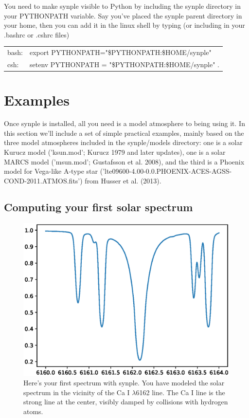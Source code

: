 \documentclass[]{article}
\begin{document}
You need to make synple visible to Python by including the synple directory in your PYTHONPATH variable. Say you've placed the synple parent directory in your home, then you can add it in the linux shell by typing (or including in your .bashrc or .cshrc files)
\begin{table}[h]
\begin{tabular}{ll}
bash: & export PYTHONPATH="\$PYTHONPATH:\$HOME/synple"  \\
csh:  & setenv PYTHONPATH = "\$PYTHONPATH:\$HOME/synple" .
\end{tabular}
\end{table}


\section{Examples}

Once synple is installed, all you need is a model atmosphere to being using it. In this section we'll include a set of simple practical examples, mainly based on the three model atmospheres included in the synple/models directory: one is a solar Kurucz model ('ksun.mod'; Kurucz 1979 and later updates), one is a solar MARCS model ('msun.mod'; Gustafsson et al. 2008), and the third is a Phoenix model for Vega-like A-type star ('lte09600-4.00-0.0.PHOENIX-ACES-AGSS-COND-2011.ATMOS.fits') from Husser et al. (2013).


\subsection{Computing your first solar spectrum}
\label{6162}


\begin{figure}[t!]
\centering
\includegraphics[width=14cm]{Figure_1.ps}
\caption{Here's your first spectrum with synple. You have modeled the solar spectrum in the vicinity of the Ca I $\lambda$6162 line. The Ca I line is the strong line at the center, visibly damped by collisions with hydrogen atoms.
\label{first}
}
\end{figure}
\end{document}
